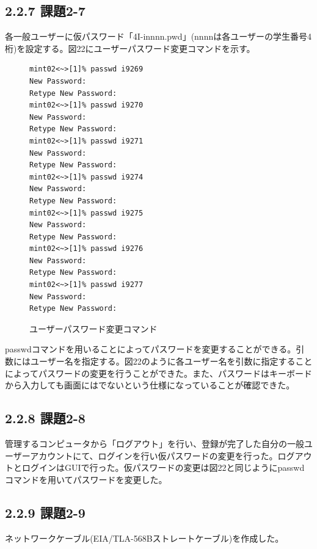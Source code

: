 \documentclass[12pt]{jreport}
\begin{document}
            \subsection*{2.2.7 課題2-7}
                各一般ユーザーに仮パスワード「4I-innnn.pwd」(nnnnは各ユーザーの学生番号4桁)を設定する。図22にユーザーパスワード変更コマンドを示す。
                \begin{figure}[H]
                    \begin{center}
                        \begin{screen}
                            \begin{verbatim}
mint02<~>[1]% passwd i9269
New Password: 
Retype New Password: 
mint02<~>[1]% passwd i9270
New Password: 
Retype New Password: 
mint02<~>[1]% passwd i9271
New Password: 
Retype New Password: 
mint02<~>[1]% passwd i9274
New Password: 
Retype New Password: 
mint02<~>[1]% passwd i9275
New Password: 
Retype New Password: 
mint02<~>[1]% passwd i9276
New Password: 
Retype New Password: 
mint02<~>[1]% passwd i9277
New Password: 
Retype New Password: 
                            \end{verbatim}
                        \end{screen}
                        \caption{ユーザーパスワード変更コマンド}
                        \label{22}
                    \end{center}
                \end{figure}
                passwdコマンドを用いることによってパスワードを変更することができる。引数にはユーザー名を指定する。図22のように各ユーザー名を引数に指定することによってパスワードの変更を行うことができた。また、パスワードはキーボードから入力しても画面にはでないという仕様になっていることが確認できた。
            \subsection*{2.2.8 課題2-8}
                管理するコンピュータから「ログアウト」を行い、登録が完了した自分の一般ユーザーアカウントにて、ログインを行い仮パスワードの変更を行った。ログアウトとログインはGUIで行った。仮パスワードの変更は図22と同じようにpasswdコマンドを用いてパスワードを変更した。
            \subsection*{2.2.9 課題2-9}
                ネットワークケーブル(EIA/TLA-568Bストレートケーブル)を作成した。
\end{document}
